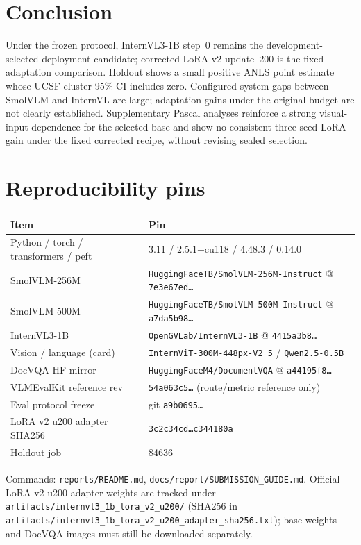 \documentclass[11pt,a4paper]{article}
\begin{document}
\section{Conclusion}

Under the frozen protocol, InternVL3-1B step~0 remains the development-selected deployment candidate; corrected LoRA v2 update~200 is the fixed adaptation comparison.
Holdout shows a small positive ANLS point estimate whose UCSF-cluster 95\% CI includes zero.
Configured-system gaps between SmolVLM and InternVL are large; adaptation gains under the original budget are not clearly established.
Supplementary Pascal analyses reinforce a strong visual-input dependence for the selected base and show no consistent three-seed LoRA gain under the fixed corrected recipe, without revising sealed selection.

\appendix
\section{Reproducibility pins}
\label{app:repro}

{\small
\begin{tabularx}{\linewidth}{@{}L{3.2cm}X@{}}
\toprule
Item & Pin \\
\midrule
Python / torch / transformers / peft & 3.11 / 2.5.1{+}cu118 / 4.48.3 / 0.14.0 \\
SmolVLM-256M & \texttt{HuggingFaceTB/SmolVLM-256M-Instruct} @ \texttt{7e3e67ed\ldots} \\
SmolVLM-500M & \texttt{HuggingFaceTB/SmolVLM-500M-Instruct} @ \texttt{a7da5b98\ldots} \\
InternVL3-1B & \texttt{OpenGVLab/InternVL3-1B} @ \texttt{4415a3b8\ldots} \\
Vision / language (card) & \texttt{InternViT-300M-448px-V2\_5} / \texttt{Qwen2.5-0.5B} \\
DocVQA HF mirror & \texttt{HuggingFaceM4/DocumentVQA} @ \texttt{a44195f8\ldots} \\
VLMEvalKit reference rev & \texttt{54a063c5\ldots} (route/metric reference only) \\
Eval protocol freeze & git \texttt{a9b0695\ldots} \\
LoRA v2 u200 adapter SHA256 & \texttt{3c2c34cd\ldots c344180a} \\
Holdout job & 84636 \\
\bottomrule
\end{tabularx}
}

Commands: \texttt{reports/README.md}, \texttt{docs/report/SUBMISSION\_GUIDE.md}.
Official LoRA v2 u200 adapter weights are tracked under \texttt{artifacts/internvl3\_1b\_lora\_v2\_u200/} (SHA256 in \texttt{artifacts/internvl3\_1b\_lora\_v2\_u200\_adapter\_sha256.txt}); base weights and DocVQA images must still be downloaded separately.
\end{document}
